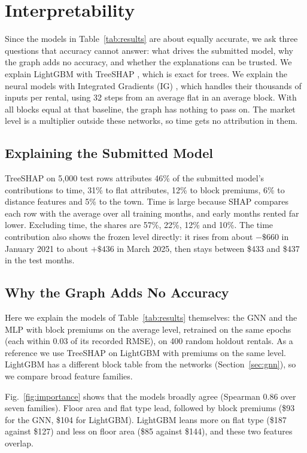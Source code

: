 \section{Interpretability}
\label{sec:interpretability}

Since the models in Table~\ref{tab:results} are about equally accurate, we ask three questions that accuracy cannot answer: what drives the submitted model, why the graph adds no accuracy, and whether the explanations can be trusted. We explain LightGBM with TreeSHAP \cite{Lundberg:2020:TreeSHAP}, which is exact for trees. We explain the neural models with Integrated Gradients (IG) \cite{Sundararajan:2017:IG}, which handles their thousands of inputs per rental, using 32 steps from an average flat in an average block. With all blocks equal at that baseline, the graph has nothing to pass on. The market level is a multiplier outside these networks, so time gets no attribution in them.

\subsection{Explaining the Submitted Model}

TreeSHAP on 5,000 test rows attributes 46\% of the submitted model's contributions to time, 31\% to flat attributes, 12\% to block premiums, 6\% to distance features and 5\% to the town. Time is large because SHAP compares each row with the average over all training months, and early months rented far lower. Excluding time, the shares are 57\%, 22\%, 12\% and 10\%. The time contribution also shows the frozen level directly: it rises from about $-\$660$ in January 2021 to about $+\$436$ in March 2025, then stays between \$433 and \$437 in the test months.

\subsection{Why the Graph Adds No Accuracy}

Here we explain the models of Table~\ref{tab:results} themselves: the GNN and the MLP with block premiums on the average level, retrained on the same epochs (each within 0.03 of its recorded RMSE), on 400 random holdout rentals. As a reference we use TreeSHAP on LightGBM with premiums on the same level. LightGBM has a different block table from the networks (Section~\ref{sec:gnn}), so we compare broad feature families.

Fig.~\ref{fig:importance} shows that the models broadly agree (Spearman 0.86 over seven families). Floor area and flat type lead, followed by block premiums (\$93 for the GNN, \$104 for LightGBM). LightGBM leans more on flat type (\$187 against \$127) and less on floor area (\$85 against \$144), and these two features overlap.

